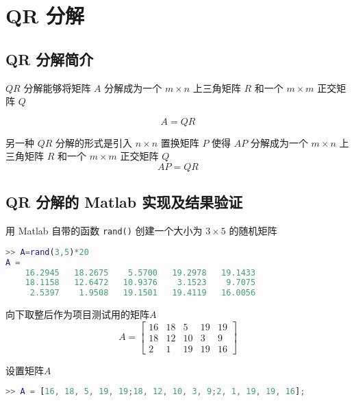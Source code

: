 \chapter{QR 分解}
\section{QR 分解简介}
$QR$ 分解能够将矩阵 $A$ 分解成为一个 $m\times n$ 上三角矩阵 $R$ 和一个 $m\times m$ 正交矩阵 $Q$

\begin{equation}
    A = QR
    \label{QR-decomposition}
\end{equation}

另一种 $QR$ 分解的形式是引入 $n\times n$ 置换矩阵 $P$ 使得 $AP$ 分解成为一个 $m\times n$ 上三角矩阵 $R$ 和一个 $m\times m$ 正交矩阵 $Q$
\begin{equation}
    AP = QR
    \label{QRP-decomposition}
\end{equation}

\section{QR 分解的 Matlab 实现及结果验证}
用 Matlab 自带的函数 \lstinline|rand()| 创建一个大小为 $3\times 5$ 的随机矩阵

\begin{lstlisting}[language=Matlab]  
>> A=rand(3,5)*20
A =
    16.2945   18.2675    5.5700   19.2978   19.1433
    18.1158   12.6472   10.9376    3.1523    9.7075
     2.5397    1.9508   19.1501   19.4119   16.0056
\end{lstlisting}


向下取整后作为项目测试用的矩阵$A$
\begin{equation}
    A=\begin{bmatrix}
        16&   18&    5&   19&   19\\
        18&   12&   10&    3&    9\\
        2&    1&   19&   19&   16
    \end{bmatrix}
\end{equation}






设置矩阵$A$
\begin{lstlisting}[language=Matlab]  
>> A = [16, 18, 5, 19, 19;18, 12, 10, 3, 9;2, 1, 19, 19, 16];
\end{lstlisting}

